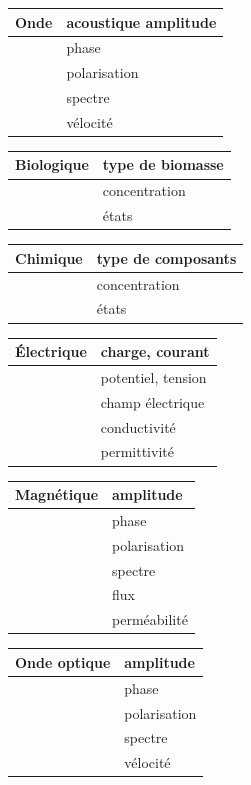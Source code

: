 \begin {center}
\begin{tabular}{|p{3cm}|p{7cm}|}
\hline
Onde & acoustique	amplitude \\
\hline
 & 	phase \\
\hline
 & 	polarisation \\
\hline
 & 	spectre \\
\hline
 & 	vélocité \\
\hline
\end{tabular}
\begin{tabular}{|p{3cm}|p{7cm}|}
Biologique &	type de biomasse \\
\hline
 & 	concentration \\
\hline
 & 	états \\
\hline
\end{tabular}
\begin{tabular}{|p{3cm}|p{7cm}|}
Chimique &	type de composants \\
\hline
 & 	concentration \\
\hline
 & 	états \\
\hline
\end{tabular}
\begin{tabular}{|p{3cm}|p{7cm}|}
Électrique &	charge, courant \\
\hline
 & 	potentiel, tension \\
\hline
 & 	champ électrique \\
\hline
 & 	conductivité \\
\hline
 & 	permittivité \\
\hline
\end{tabular}
\begin{tabular}{|p{3cm}|p{7cm}|}
Magnétique &	amplitude \\
\hline
  &	phase \\
\hline
  &	polarisation \\
\hline
  &	spectre \\
\hline
  &	flux \\
\hline
  &	perméabilité \\
\hline
\end{tabular}
\begin{tabular}{|p{3cm}|p{7cm}|}
Onde optique &	amplitude \\
\hline
 & 	phase \\
\hline
 & 	polarisation \\
\hline
 & 	spectre \\
\hline
 & 	vélocité \\

\end{tabular}
\end{center}

